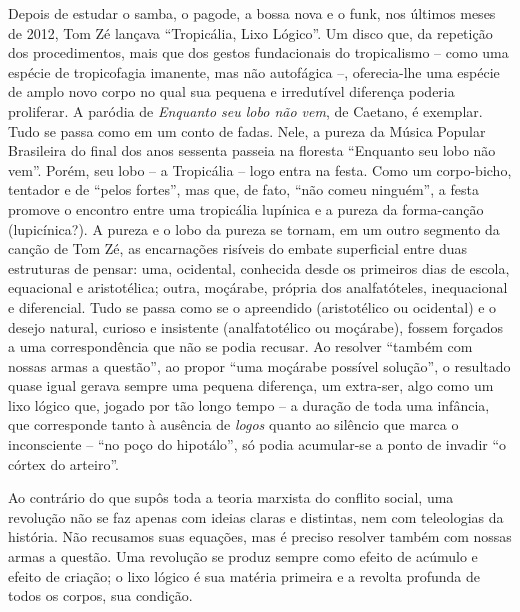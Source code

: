Depois de estudar o samba, o pagode, a bossa nova
e o funk, nos últimos meses de 2012, Tom Zé lançava ``Tropicália, Lixo
Lógico''. Um disco que, da repetição dos procedimentos, mais que dos
gestos fundacionais do tropicalismo -- como uma espécie de tropicofagia
imanente, mas não autofágica --, oferecia-lhe uma espécie de amplo novo
corpo no qual sua pequena e irredutível diferença poderia proliferar. A
paródia de \emph{Enquanto seu lobo não vem}, de Caetano, é exemplar.
Tudo se passa como em um conto de fadas. Nele, a pureza da Música
Popular Brasileira do final dos anos sessenta passeia na floresta
``Enquanto seu lobo não vem''. Porém, seu lobo -- a Tropicália -- logo
entra na festa. Como um corpo-bicho, tentador e de ``pelos fortes'', mas
que, de fato, ``não comeu ninguém'', a festa promove o encontro entre
uma tropicália lupínica e a pureza da forma-canção (lupicínica?). A
pureza e o lobo da pureza se tornam, em um outro segmento da canção de
Tom Zé, as encarnações risíveis do embate superficial entre duas
estruturas de pensar: uma, ocidental, conhecida desde os primeiros dias
de escola, equacional e aristotélica; outra, moçárabe, própria dos
analfatóteles, inequacional e diferencial. Tudo se passa como se o
apreendido (aristotélico ou ocidental) e o desejo natural, curioso e
insistente (analfatotélico ou moçárabe), fossem forçados a uma
correspondência que não se podia recusar. Ao resolver ``também com
nossas armas a questão'', ao propor ``uma moçárabe possível solução'', o
resultado quase igual gerava sempre uma pequena diferença, um extra-ser,
algo como um lixo lógico que, jogado por tão longo tempo -- a duração de
toda uma infância, que corresponde tanto à ausência de \emph{logos}
quanto ao silêncio que marca o inconsciente -- ``no poço do hipotálo'',
só podia acumular-se a ponto de invadir ``o córtex do arteiro''.

Ao contrário do que supôs toda a teoria marxista do conflito social, uma
revolução não se faz apenas com ideias claras e distintas, nem com
teleologias da história. Não recusamos suas equações, mas é preciso
resolver também com nossas armas a questão. Uma revolução se produz
sempre como efeito de acúmulo e efeito de criação; o lixo lógico é sua
matéria primeira e a revolta profunda de todos os corpos, sua condição.

